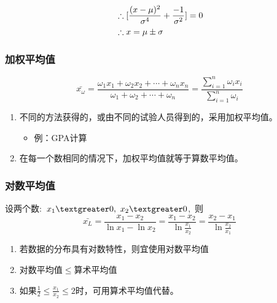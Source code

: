 \documentclass[UTF8]{ctexart}
\begin{document}
\begin{equation}
  \begin{aligned}\notag
    &\therefore[\frac{(x-\mu )^2}{\sigma ^4}+\frac{-1}{\sigma ^2}]=0
    \\&\therefore x=\mu \pm \sigma 
  \end{aligned}
\end{equation}

\subsubsection{加权平均值}
\begin{equation}
  \bar{x_\omega }=\frac{\omega_{1}x_{1}+\omega_{2}x_{2}+\cdots +\omega_{n}x_{n}}{\omega_{1}+\omega_{2}+\cdots +\omega_{n}}
                 =\frac{\sum\limits_{i=1}^n\omega_{i}x_{i}}{\sum\limits_{i=1}^n\omega_{i}}
\end{equation}
  
\begin{enumerate}[•]
  \item 不同的方法获得的，或由不同的试验人员得到的，采用加权平均值。
    \begin{itemize}
      \item 例：GPA计算
    \end{itemize} 
  \item 在每一个数相同的情况下，加权平均值就等于算数平均值。
\end{enumerate}

\subsubsection{对数平均值}
\par 设两个数:\ $x_{1}\textgreater0,\  x_{2}\textgreater0$,\ 则
\begin{equation}
\bar{x_L}=\frac{x_{1}-x_2}{\ln {x_1}-\ln {x_2}}=\frac{x_{1}-x_2}{\ln \frac{x_1}{x_2}}=\frac{x_{2}-x_1}{\ln \frac{x_2}{x_1}}
\end{equation}
\begin{enumerate}[•]
  \item 若数据的分布具有对数特性，则宜使用对数平均值
  \item 对数平均值$\leqslant $算术平均值
  \item 如果$\frac{1}{2}\leqslant \frac{x_1}{x_2} \leqslant 2 $时，可用算术平均值代替。
\end{enumerate}
\end{document}
